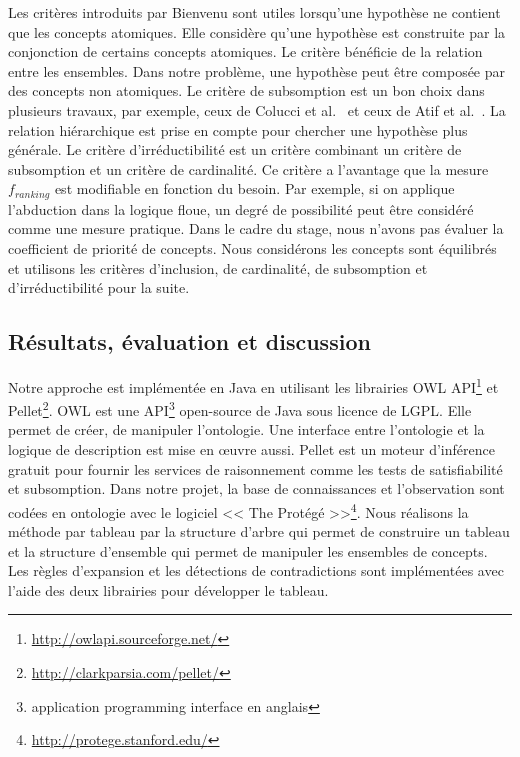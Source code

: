 \documentclass{article}
\begin{document}
Les critères introduits par Bienvenu sont utiles lorsqu'une hypothèse ne contient que les concepts atomiques. Elle considère qu'une hypothèse est construite par la conjonction de certains concepts atomiques.
Le critère bénéficie de la relation entre les ensembles. Dans notre problème, une hypothèse peut être composée par des concepts non atomiques. Le critère de subsomption est un bon choix dans plusieurs travaux,
par exemple, ceux de Colucci et al.~\cite{colucci2004uniform} et ceux de Atif et al.~\cite{jamal13}. La relation hiérarchique est prise en compte pour chercher une hypothèse plus générale.
Le critère d'irréductibilité est un critère combinant un critère de subsomption et un critère de cardinalité. Ce critère a l'avantage que la mesure $f_{ranking}$ est modifiable en fonction du besoin.
Par exemple, si on applique l'abduction dans la logique floue, un degré de possibilité peut être considéré comme une mesure pratique. Dans le cadre du stage, nous n'avons pas évaluer la coefficient de priorité
de concepts. Nous considérons les concepts sont équilibrés et utilisons les critères d'inclusion, de cardinalité, de subsomption et d'irréductibilité pour la suite.




\subsection{Résultats, évaluation et discussion}
Notre approche est implémentée en Java en utilisant les librairies OWL API\footnote{\url{http://owlapi.sourceforge.net/}} et Pellet\footnote{\url{http://clarkparsia.com/pellet/}}.
OWL est une API\footnote{application programming interface en anglais} open-source de Java sous licence de LGPL. 
Elle permet de créer, de manipuler l'ontologie. Une interface entre l'ontologie et la logique de description est mise en {\oe}uvre aussi.
Pellet est un moteur d'inférence gratuit pour fournir les services de raisonnement comme les tests de satisfiabilité et subsomption.
Dans notre projet,  la base de connaissances et l'observation sont codées en ontologie avec le logiciel << The Protégé >>\footnote{\url{http://protege.stanford.edu/}}.
Nous réalisons la méthode par tableau par la structure d'arbre qui permet de construire un tableau et la structure d'ensemble qui permet de
manipuler les ensembles de concepts. Les règles d'expansion et les détections de contradictions sont implémentées avec l'aide des deux librairies pour développer le tableau.
\end{document}
